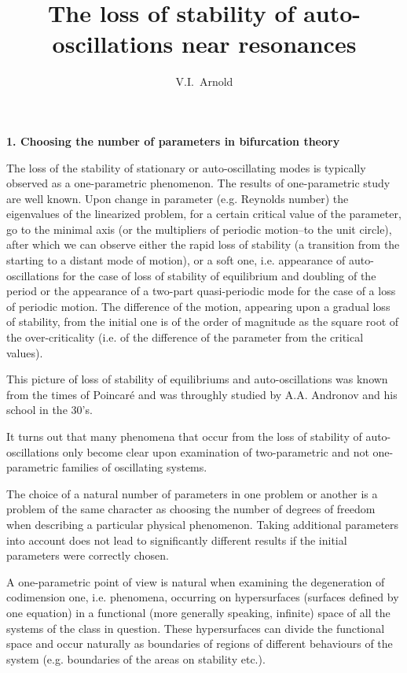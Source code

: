 \documentclass[12pt]{amsart}
\title{The loss of stability of auto-oscillations near resonances}
\author{V.I.~Arnold}
\begin{document}
\maketitle
\centerline{\textbf{1. Choosing the number of parameters in bifurcation theory}}
\vspace{1em}
The loss of the stability of stationary or auto-oscillating modes is typically
observed as a one-parametric phenomenon.
The results of one-parametric study are well known.
Upon change in parameter (e.g. Reynolds number) the eigenvalues of the
linearized problem, for a certain critical value of the parameter, go to the
minimal axis (or the multipliers of periodic motion--to the unit circle), after
which we can observe either the rapid loss of stability (a transition from the
starting to a distant mode of motion), or a soft one, i.e. appearance of
auto-oscillations for the case of loss of stability of equilibrium and doubling
of the period or the appearance of a two-part quasi-periodic mode for the case
of a loss of periodic motion.
The difference of the motion, appearing upon a gradual loss of stability, from
the initial one is of the order of magnitude as the square root of the
over-criticality (i.e. of the difference of the parameter from the critical
values).

This picture of loss of stability of equilibriums and auto-oscillations was
known from the times of Poincar\'e and was throughly studied by A.A. Andronov and
his school in the 30's.

It turns out that many phenomena that occur from the loss of stability of
auto-oscillations only become clear upon examination of two-parametric and not
one-parametric families of oscillating systems.

The choice of a natural number of parameters in one problem or another is a
problem of the same character as choosing the number of degrees of freedom
when describing a particular physical phenomenon.
Taking additional parameters into account does not lead to significantly
different results if the initial parameters were correctly chosen.

A one-parametric point of view is natural when examining the degeneration of
codimension one, i.e. phenomena, occurring on hypersurfaces (surfaces defined by
one equation) in a functional (more generally speaking, infinite) space of all
the systems of the class in question.
These hypersurfaces can divide the functional space and occur naturally as
boundaries of regions of different behaviours of the system (e.g. boundaries of
the areas on stability etc.).
\end{document}
